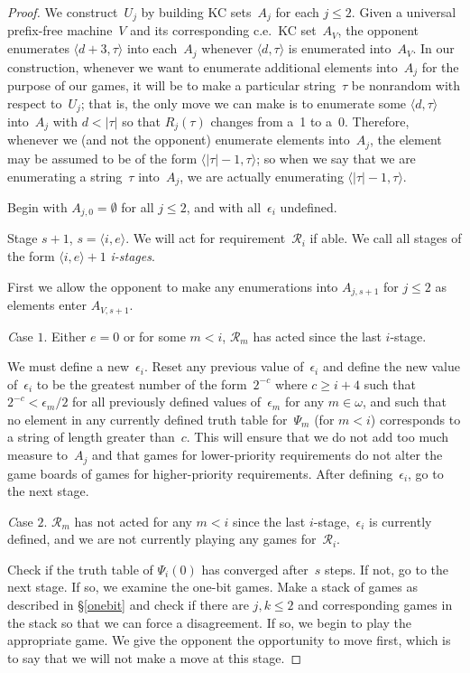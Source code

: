 \documentclass{LMCS}
\newcommand{\0}{\mathbf{0}}
\newcommand{\es}{\emptyset}
\newcommand{\ce}{c.e.\ }
\newcommand{\<}{\langle}
\renewcommand{\>}{\rangle}
\begin{document}
\begin{proof}
We construct~$U_j$ by building KC sets~$A_j$ for each $j \le 2$.  Given a
universal prefix-free machine~$V$ and its corresponding \ce KC set~$A_V$, the
opponent enumerates $\langle d+3,\tau\rangle$ into each~$A_j$ whenever
$\langle d, \tau \rangle$ is enumerated into~$A_V$.  In our construction,
whenever we want to enumerate additional elements into~$A_j$ for the purpose
of our games, it will be to make a particular string~$\tau$ be nonrandom with
respect to~$U_j$; that is, the only move we can make is to enumerate some
$\langle d,\tau\rangle$ into~$A_j$ with $d<|\tau|$ so that $R_j(\tau)$
changes from a~1 to a~0.  Therefore, whenever we (and not the opponent)
enumerate elements into~$A_j$, the element may be assumed to be of the form
$\langle |\tau|-1, \tau\rangle$; so when we say that we are enumerating a
string~$\tau$ into~$A_j$, we are actually enumerating $\langle |\tau|-1,
\tau\rangle$.

Begin with $A_{j,0}=\es$ for all $j \le 2$, and with all~$\epsilon_i$
undefined.

Stage $s+1$, $s=\langle i, e\rangle$.  We will act for
requirement~$\mathcal{R}_i$ if able.  We call all stages of the form $\langle
i,e\rangle+1$ {\em i-stages}.

First we allow the opponent to make any enumerations into $A_{j,s+1}$ for
$j \le 2$ as elements enter $A_{V,s+1}$.

\medskip
{\emph Case $1$.} Either $e=0$ or for some $m<i$, $\mathcal{R}_m$ has acted
since the last $i$-stage.

We must define a new~$\epsilon_i$.  Reset any previous value of~$\epsilon_i$
and define the new value of~$\epsilon_i$ to be the greatest number of the
form~$2^{-c}$ where $c\geq i+4$ such that $2^{-c}<\epsilon_m/2$ for all
previously defined values of~$\epsilon_m$ for any $m\in \omega$, and such
that no element in any currently defined truth table for~$\Psi_m$ (for $m<i$)
corresponds to a string of length greater than~$c$.  This will ensure that we
do not add too much measure to~$A_j$ and that games for lower-priority
requirements do not alter the game boards of games for higher-priority
requirements.  After defining~$\epsilon_i$, go to the next stage.

\medskip
{\emph Case $2$.} $\mathcal{R}_m$ has not acted for any $m<i$ since the last
$i$-stage,~$\epsilon_i$ is currently defined, and we are not currently
playing any games for~$\mathcal{R}_i$.

Check if the truth table of $\Psi_i(0)$ has converged after~$s$ steps.  If
not, go to the next stage.  If so, we examine the one-bit games.  Make a
stack of games as described in \S\ref{onebit} and check if there are $j,k \le
2$ and corresponding games in the stack so that we can force a disagreement.
If so, we begin to play the appropriate game.  We give the opponent the
opportunity to move first, which is to say that we will not make a move at
this stage.


\end{proof}
\end{document}
